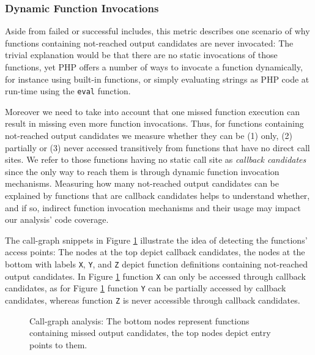 \documentclass[sigconf, preprint]{acmart}
\renewcommand{\tt}[1]{\texttt{#1}}
\begin{document}
\subsubsection{Dynamic Function Invocations}
\label{WhyDidFunctionCallsFail}
Aside from failed or successful includes, this metric describes one scenario of
why functions containing not-reached output candidates are never invocated: The
trivial explanation would be that there are no static invocations of those
functions, yet PHP offers a number of ways to invocate a function dynamically,
for instance using built-in functions, or simply evaluating strings as PHP code
at run-time using the \texttt{eval} function.

Moreover we need to take into account that one missed function execution can
result in missing even more function invocations.
Thus, for functions containing not-reached output candidates we measure whether
they can be (1) only, (2) partially or (3) never accessed transitively from
functions that have no direct call sites. We refer to those functions having no
static call site as \emph{callback candidates} since the only way to reach them
is through dynamic function invocation mechanisms. Measuring how many not-reached output candidates can be explained by functions that are callback
candidates helps to understand whether, and if so, indirect function invocation
mechanisms and their usage may impact our analysis’ code coverage.

The call-graph snippets in Figure \ref{fig:callgraph} illustrate the idea of
detecting the functions’ access points: The nodes at the top depict callback
candidates, the nodes at the bottom with labels \tt{X}, \tt{Y}, and \tt{Z}
depict function definitions containing not-reached output candidates. In Figure
\ref{fig:callgraph} function \tt{X} can only be accessed through callback
candidates, as for Figure \ref{fig:callgraph} function \tt{Y} can be partially
accessed by callback candidates, whereas function \tt{Z} is never accessible
through callback candidates.

\begin{figure}
    
    \caption{Call-graph analysis: The bottom nodes represent functions
    containing missed output candidates, the top nodes depict entry points to
    them.}
    \label{fig:callgraph} 
\end{figure}

\end{document}
